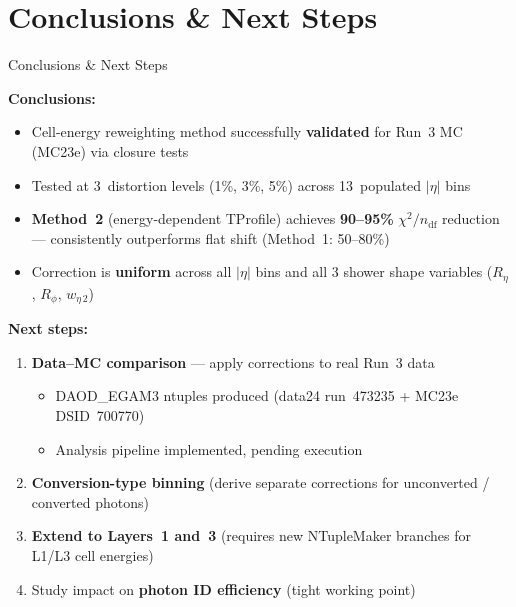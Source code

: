 \documentclass[aspectratio=169,10pt]{beamer}
\begin{document}
\section{Conclusions \& Next Steps}

\begin{frame}{Conclusions \& Next Steps}

\textbf{Conclusions:}
\begin{itemize}
  \item Cell-energy reweighting method successfully \textbf{validated} for
        Run~3 MC (MC23e) via closure tests
  \item Tested at 3~distortion levels (1\%, 3\%, 5\%) across
        13~populated $|\eta|$ bins
  \item \textbf{Method~2} (energy-dependent TProfile) achieves
        \textbf{90--95\%} $\chi^2/n_\text{df}$ reduction —
        consistently outperforms flat shift (Method~1: 50--80\%)
  \item Correction is \textbf{uniform} across all $|\eta|$ bins and all
        3 shower shape variables ($R_\eta$, $R_\phi$, $w_{\eta\,2}$)
\end{itemize}

\vspace{6pt}
\textbf{Next steps:}
\begin{enumerate}
  \item \textbf{Data--MC comparison} — apply corrections to real Run~3 data
    \begin{itemize}
      \item DAOD\_EGAM3 ntuples produced
            (data24 run~473235 + MC23e DSID~700770)
      \item Analysis pipeline implemented, pending execution
    \end{itemize}
  \item \textbf{Conversion-type binning}
        (derive separate corrections for unconverted / converted photons)
  \item \textbf{Extend to Layers~1 and~3}
        (requires new NTupleMaker branches for L1/L3 cell energies)
  \item Study impact on \textbf{photon ID efficiency} (tight working point)
\end{enumerate}
\end{frame}
\end{document}
